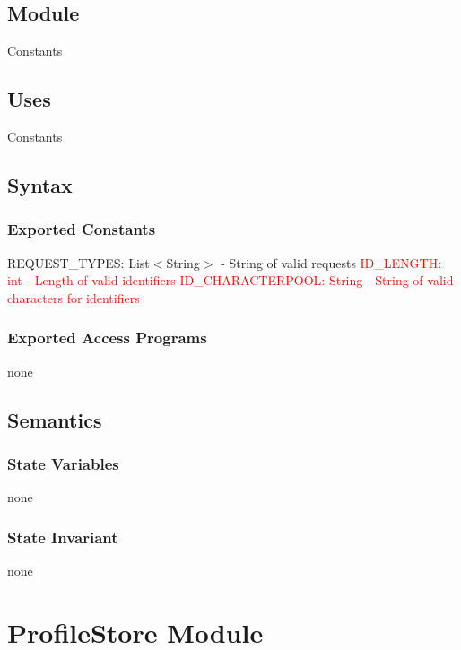 \documentclass[12pt, titlepage]{article}
\newcommand{\newConstantsModule}[6]{
	\subsection* {Module}
		#1
	\subsection* {Uses}
		#2
	\subsection* {Syntax}
		\subsubsection* {Exported Constants}
			#3
		\subsubsection* {Exported Access Programs}
			#4
	\subsection* {Semantics}
		\subsubsection* {State Variables}
			#5
		\subsubsection* {State Invariant}
			#6
}
\begin{document}
\label{Constants}
\newConstantsModule{Constants}
	{%
		Constants
	}
	{%
		REQUEST\_TYPES: List$<$String$>$ - String of valid requests
		\textcolor{red}{ID\_LENGTH: int - Length of valid identifiers}
		\textcolor{red}{ID\_CHARACTERPOOL: String - String of valid characters for identifiers}
	}
	{%
	none
	}
	{%
		none\\
	}
	{%
        none
	}
% 		
	
\newpage

\section {ProfileStore Module}

\label{ProfileStore}
\end{document}
